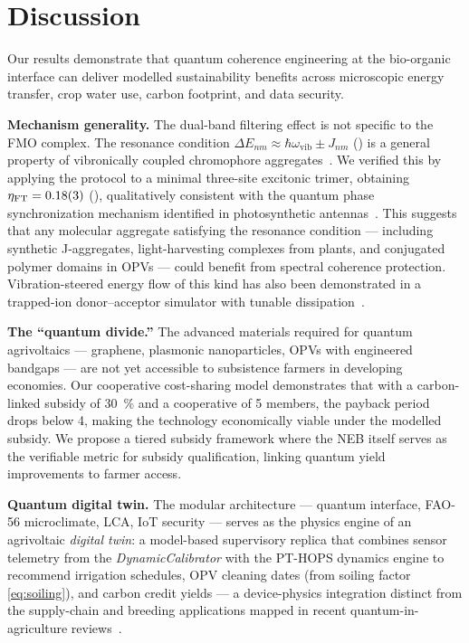 \documentclass[preprint,12pt]{elsarticle}
\begin{document}

\section*{Discussion}

Our results demonstrate that quantum coherence engineering at the bio-organic interface can deliver modelled sustainability benefits across microscopic energy transfer, crop water use, carbon footprint, and data security.

\textbf{Mechanism generality.} The dual-band filtering effect is not specific to the FMO complex.
The resonance condition $\Delta E_{nm} \approx \hbar\omega_{\mathrm{vib}} \pm J_{nm}$ () is a general property of vibronically coupled chromophore aggregates~\cite{Chin2013}.
We verified this by applying the protocol to a minimal three-site excitonic trimer, obtaining $\eta_{\mathrm{FT}} = \num{0.18 \pm 0.03}$ (), qualitatively consistent with the quantum phase synchronization mechanism identified in photosynthetic antennas~\cite{Zhu2024}.
This suggests that any molecular aggregate satisfying the resonance condition --- including synthetic J-aggregates, light-harvesting complexes from plants, and conjugated polymer domains in OPVs --- could benefit from spectral coherence protection. Vibration-steered energy flow of this kind has also been demonstrated in a trapped-ion donor--acceptor simulator with tunable dissipation~\cite{So2024}.

\textbf{The ``quantum divide.''} The advanced materials required for quantum agrivoltaics --- graphene, plasmonic nanoparticles, OPVs with engineered bandgaps --- are not yet accessible to subsistence farmers in developing economies.
Our cooperative cost-sharing model demonstrates that with a carbon-linked subsidy of \qty{30}{\percent} and a cooperative of 5 members, the payback period drops below \qty{4}{\yr}, making the technology economically viable under the modelled subsidy.
We propose a tiered subsidy framework where the NEB itself serves as the verifiable metric for subsidy qualification, linking quantum yield improvements to farmer access.

\textbf{Quantum digital twin.} The modular architecture --- quantum interface, FAO-56 microclimate, LCA, IoT security --- serves as the physics engine of an agrivoltaic \emph{digital twin}: a model-based supervisory replica that combines sensor telemetry from the \textit{DynamicCalibrator} with the PT-HOPS dynamics engine to recommend irrigation schedules, OPV cleaning dates (from soiling factor \cref{eq:soiling}), and carbon credit yields --- a device-physics integration distinct from the supply-chain and breeding applications mapped in recent quantum-in-agriculture reviews~\cite{Pook2025}.
\end{document}
